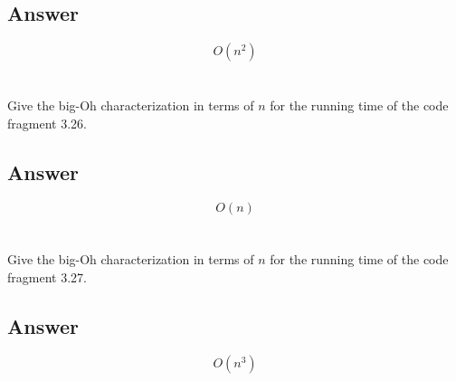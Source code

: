 \documentclass{article}
\begin{document}
\subsection{Answer}

\begin{mdframed}

  \begin{equation*}
    O(n^2)
  \end{equation*}

\end{mdframed}


\section{}

Give the big-Oh characterization in terms of \(n\) for the running time of the
code fragment 3.26.

\subsection{Answer}

\begin{mdframed}

  \begin{equation*}
    O(n)
  \end{equation*}

\end{mdframed}


\section{}

Give the big-Oh characterization in terms of \(n\) for the running time of the
code fragment 3.27.

\subsection{Answer}

\begin{mdframed}

  \begin{equation*}
    O(n^3)
  \end{equation*}

\end{mdframed}


\section{}
\end{document}
